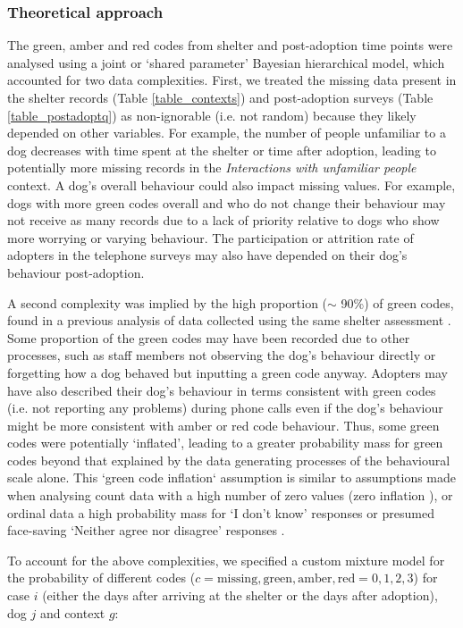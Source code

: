 \documentclass[fleqn,10pt]{wlscirep}
\begin{document}
\subsubsection*{Theoretical approach}\label{sec_theoretical_approach}
The green, amber and red codes from shelter and post-adoption time points were analysed using a joint or `shared parameter' \cite{vonesh2006,tseng2016} Bayesian hierarchical model, which accounted for two data complexities. First, we treated the missing data present in the shelter records (Table \ref{table_contexts}) and post-adoption surveys (Table \ref{table_postadoptq}) as non-ignorable (i.e. not random) because they likely depended on other variables. For example, the number of people unfamiliar to a dog decreases with time spent at the shelter or time after adoption, leading to potentially more missing records in the \textit{Interactions with unfamiliar people} context. A dog’s overall behaviour could also impact missing values. For example, dogs with more green codes overall and who do not change their behaviour may not receive as many records due to a lack of priority relative to dogs who show more worrying or varying behaviour. The participation or attrition rate of adopters in the telephone surveys may also have depended on their dog’s behaviour post-adoption.

A second complexity was implied by the high proportion ($\sim$ 90\%) of green codes, found in a previous analysis of data collected using the same shelter assessment \cite{goold2017modelling}. Some proportion of the green codes may have been recorded due to other processes, such as staff members not observing the dog’s behaviour directly or forgetting how a dog behaved but inputting a green code anyway. Adopters may have also described their dog’s behaviour in terms consistent with green codes (i.e. not reporting any problems) during phone calls even if the dog’s behaviour might be more consistent with amber or red code behaviour. Thus, some green codes were potentially ‘inflated’, leading to a greater probability mass for green codes beyond that explained by the data generating processes of the behavioural scale alone. This `green code inflation` assumption is similar to assumptions made when analysing count data with a high number of zero values (zero inflation \cite{lambert1992}), or ordinal data a high probability mass for ‘I don’t know’ responses \cite{kelley2008} or presumed face-saving ‘Neither agree nor disagree’ responses \cite{bagozzi2012}.

To account for the above complexities, we specified a custom mixture model for the probability of different codes ($c = {\text{missing}, \text{green}, \text{amber}, \text{red}} = {0, 1, 2, 3}$) for case $i$ (either the days after arriving at the shelter or the days after adoption), dog $j$ and context $g$:
\end{document}

